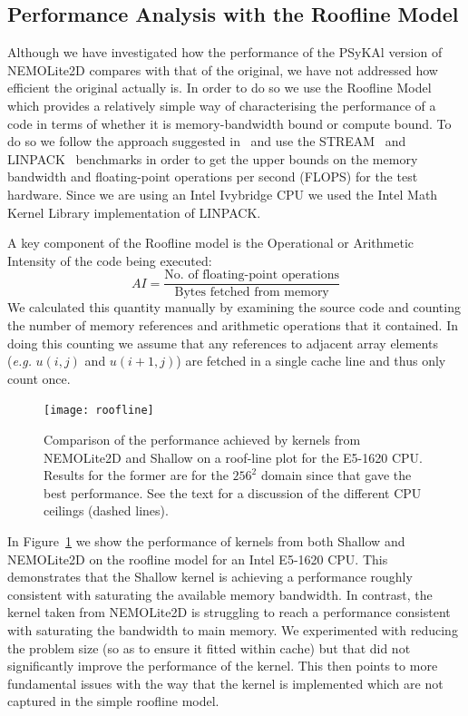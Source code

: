 \documentclass[gmd, manuscript]{copernicus}
\begin{document}

\subsection{Performance Analysis with the Roofline Model}

Although we have investigated how the performance of the {PS}y{KA}l
version of NEMOLite2D compares with that of the original, we have not
addressed how efficient the original actually is. In order to do so we
use the Roofline Model~\citep{roofline} which provides a relatively
simple way of characterising the performance of a code in terms of
whether it is memory-bandwidth bound or compute bound. To do so we
follow the approach suggested in~\cite{para_pearls} and use the
STREAM~\citep{stream} and LINPACK~\citep{linpack} benchmarks in order to
get the upper bounds on the memory bandwidth and floating-point
operations per second (FLOPS) for the test hardware. Since we are
using an Intel Ivybridge CPU we used the Intel Math Kernel Library
implementation of LINPACK.

A key component of the Roofline model is the Operational or Arithmetic
Intensity of the code being executed:
\[
AI = \frac{\textrm{No. of floating-point operations}}{\textrm{Bytes fetched from memory}}
\]
We calculated this quantity manually by examining the
source code and counting the number of memory references and
arithmetic operations that it contained. In doing this counting we
assume that any references to adjacent array elements (\textit{e.g.}
$u(i,j)$ and $u(i+1,j)$) are fetched in a single cache line and thus
only count once.

\begin{figure}
\centering
\texttt{[image: roofline]}
\caption{Comparison of the performance achieved by kernels from
  NEMOLite2D and Shallow on a roof-line plot for the E5-1620
  CPU. Results for the former are for the $256^2$ domain since that
  gave the best performance. See the text for a discussion of the
  different CPU ceilings (dashed lines).}
\label{FIG_roofline}
\end{figure}

In Figure~\ref{FIG_roofline} we show the performance of kernels from
both Shallow and NEMOLite2D on the roofline model for an Intel E5-1620 CPU.
This demonstrates that the Shallow kernel is achieving a performance
roughly consistent with saturating the available memory bandwidth. In
contrast, the kernel taken from NEMOLite2D is struggling to reach a
performance consistent with saturating the bandwidth to main
memory. We experimented with reducing the problem size (so as to
ensure it fitted within cache) but that did not significantly improve
the performance of the kernel. This then points to more fundamental issues
with the way that the kernel is implemented which are not captured in the
simple roofline model.
\end{document}
